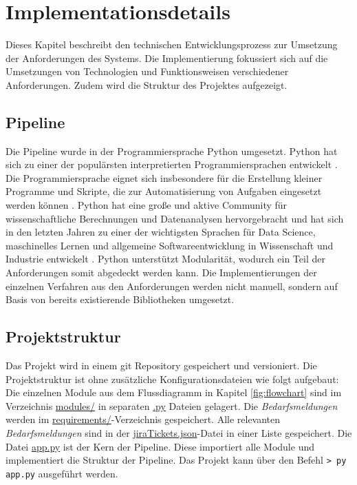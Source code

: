 \section{Implementationsdetails}
Dieses Kapitel beschreibt den technischen Entwicklungsprozess zur Umsetzung der Anforderungen des Systems. Die Implementierung fokussiert sich auf die Umsetzungen von Technologien und Funktionsweisen verschiedener Anforderungen. Zudem wird die Struktur des Projektes aufgezeigt.
\subsection{Pipeline}
Die Pipeline wurde in der Programmiersprache Python umgesetzt. Python hat sich zu einer der populärsten interpretierten Programmiersprachen entwickelt \cite{mckinney2012python}. Die Programmiersprache eignet sich insbesondere für die Erstellung kleiner Programme und Skripte, die zur Automatisierung von Aufgaben eingesetzt werden können \cite{mckinney2012python}. Python hat eine große und aktive Community für wissenschaftliche Berechnungen und Datenanalysen hervorgebracht und hat sich in den letzten Jahren zu einer der wichtigsten Sprachen für Data Science, maschinelles Lernen und allgemeine Softwareentwicklung in Wissenschaft und Industrie entwickelt \cite{mckinney2012python}. Python unterstützt Modularität, wodurch ein Teil der Anforderungen somit abgedeckt werden kann. Die Implementierungen der einzelnen Verfahren aus den Anforderungen werden nicht manuell, sondern auf Basis von bereits existierende Bibliotheken umgesetzt.
\subsection{Projektstruktur}
\label{sec:projektstruktur}
Das Projekt wird in einem git Repository gespeichert und versioniert. Die Projektstruktur ist ohne zusätzliche Konfigurationsdateien wie folgt aufgebaut:
Die einzelnen Module aus dem Flussdiagramm in Kapitel \ref{fig:flowchart} sind im Verzeichnis \url{modules/} in separaten \url{.py} Dateien gelagert. Die \emph{Bedarfsmeldungen} werden im \url{requirements/}-Verzeichnis gespeichert. Alle relevanten \emph{Bedarfsmeldungen} sind in der \url{jiraTickets.json}-Datei in einer Liste gespeichert. Die Datei \url{app.py} ist der Kern der Pipeline. Diese importiert alle Module und implementiert die Struktur der Pipeline. Das Projekt kann über den Befehl \lstinline{> py app.py} ausgeführt werden.

